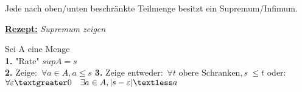     \begin{theorem} 
    Jede nach oben/unten beschränkte Teilmenge besitzt ein Supremum/Infimum.
    \end{theorem}

\noindent\begin{boxedminipage}{225pt}
		\underline{\textbf{Rezept:}} \textit{Supremum zeigen}
		
 		Sei A eine Menge\\
		\textbf{1.} "Rate" $supA = s$\\
		\textbf{2.} Zeige:\ $\forall a \in A, a \leq s$\newline
		\textbf{3.} Zeige entweder:\ $\forall t \textrm{ obere Schranken}, s \ \leq t$\newline
		\tab \tab oder:\  $\forall \varepsilon \textgreater 0 \quad \exists a \in A, |s-\varepsilon| \textless a$
		
	\end{boxedminipage}\\

